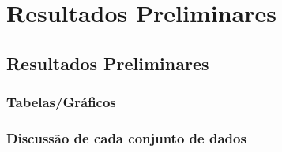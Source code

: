 \part{Resultados Preliminares}

\chapter[Resultados Preliminares]{Resultados Preliminares}


\section{Tabelas/Gráficos}
\section{Discussão de cada conjunto de dados}
